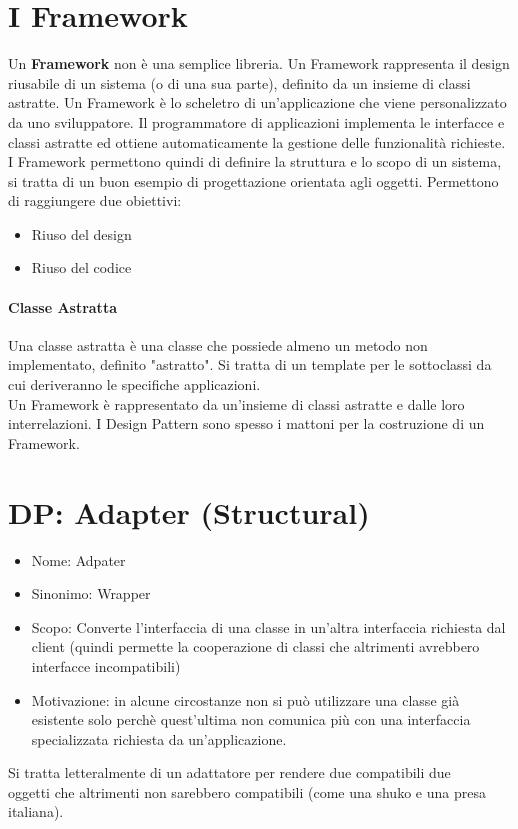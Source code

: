 \section{I Framework}
Un \textbf{Framework} non è una semplice libreria. Un Framework rappresenta il design riusabile di un
sistema (o di una sua parte), definito da un insieme di classi astratte. Un Framework è lo
scheletro di un'applicazione che viene personalizzato da uno sviluppatore. Il programmatore di
applicazioni implementa le interfacce e classi astratte ed ottiene automaticamente la gestione
delle funzionalità richieste.\\
I Framework permettono quindi di definire la struttura e lo scopo di un sistema, si tratta di un buon
esempio di progettazione orientata agli oggetti. Permettono di raggiungere due obiettivi:
\begin{itemize}
    \item Riuso del design
    \item Riuso del codice
\end{itemize}
\paragraph*{Classe Astratta} Una classe astratta è una classe che possiede almeno un metodo non
implementato, definito "astratto". Si tratta di un template per le sottoclassi da cui deriveranno
le specifiche applicazioni.\\
Un Framework è rappresentato da un'insieme di classi astratte e dalle loro interrelazioni. I Design
Pattern sono spesso i mattoni per la costruzione di un Framework.
\section{DP: Adapter (Structural)}
\begin{itemize}
    \item Nome: Adpater
    \item Sinonimo: Wrapper
    \item Scopo: Converte l'interfaccia di una classe in un'altra interfaccia richiesta dal client
    (quindi permette la cooperazione di classi che altrimenti avrebbero interfacce incompatibili)
    \item Motivazione: in alcune circostanze non si può utilizzare una classe già esistente solo
    perchè quest'ultima non comunica più con una interfaccia specializzata richiesta da un'applicazione.
\end{itemize}
Si tratta letteralmente di un adattatore per rendere due compatibili due\\ oggetti che altrimenti
non sarebbero compatibili (come una shuko e una presa italiana).\\
